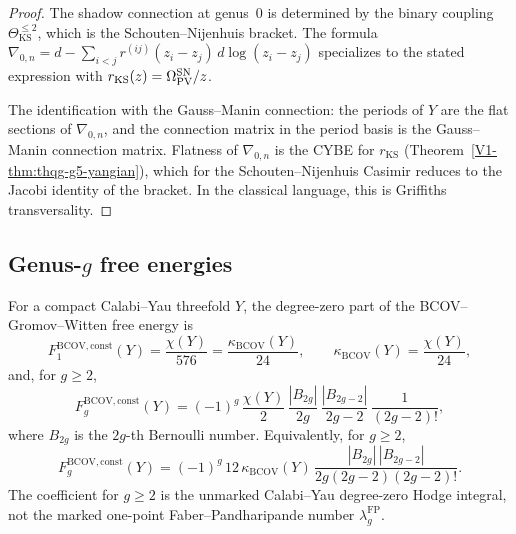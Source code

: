 \begin{proof}
The shadow connection at genus~$0$ is determined by the binary
coupling $\Theta_{\mathrm{KS}}^{\le 2}$, which is the
Schouten--Nijenhuis bracket. The formula
$\nabla_{0,n} = d - \sum_{i<j} r^{(ij)}(z_i - z_j)\,d\log(z_i - z_j)$
specializes to the stated expression with $r_{\mathrm{KS}}(z)
= \Omega_{\operatorname{PV}}^{\mathrm{SN}}/z$.

The identification with the Gauss--Manin connection:
the periods of $Y$ are the flat sections of $\nabla_{0,n}$, and the
connection matrix in the period basis is the Gauss--Manin connection
matrix. Flatness of $\nabla_{0,n}$ is the CYBE for $r_{\mathrm{KS}}$
(Theorem~\ref*{V1-thm:thqg-g5-yangian}), which for the Schouten--Nijenhuis
Casimir reduces to the Jacobi identity of the bracket. In the
classical language, this is Griffiths transversality.
\end{proof}


\subsection{Genus-$g$ free energies}

\begin{proposition}
For a compact Calabi--Yau threefold $Y$, the degree-zero part of the
BCOV--Gromov--Witten free energy is
\begin{equation}%
F_1^{\mathrm{BCOV,const}}(Y)
= \frac{\chi(Y)}{576}
= \frac{\kappa_{\mathrm{BCOV}}(Y)}{24},
\qquad
\kappa_{\mathrm{BCOV}}(Y)=\frac{\chi(Y)}{24},
\end{equation}
and, for $g\ge 2$,
\begin{equation}%
F_g^{\mathrm{BCOV,const}}(Y)
= (-1)^g\,\frac{\chi(Y)}{2}\,
\frac{|B_{2g}|}{2g}\,
\frac{|B_{2g-2}|}{2g-2}\,
\frac{1}{(2g-2)!},
\end{equation}
where $B_{2g}$ is the $2g$-th Bernoulli number.
Equivalently, for $g\ge2$,
\begin{equation}%
F_g^{\mathrm{BCOV,const}}(Y)
= (-1)^g\,12\,\kappa_{\mathrm{BCOV}}(Y)\,
\frac{|B_{2g}|\,|B_{2g-2}|}
{2g(2g-2)(2g-2)!}.
\end{equation}
The coefficient for $g\ge2$ is the unmarked Calabi--Yau
degree-zero Hodge integral, not the marked one-point
Faber--Pandharipande number $\lambda_g^{\mathrm{FP}}$.
\end{proposition}

